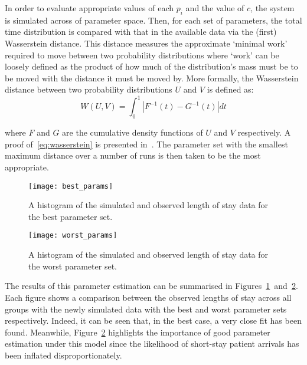 In order to evaluate appropriate values of each \(p_i\) and the value of \(c\),
the system is simulated across of parameter space. Then, for each set of
parameters, the total time distribution is compared with that in the available
data via the (first) Wasserstein distance. This distance measures the
approximate `minimal work' required to move between two probability
distributions where `work' can be loosely defined as the product of how much of
the distribution's mass must be to be moved with the distance it must be moved
by. More formally, the Wasserstein distance between two probability
distributions \(U\) and \(V\) is defined as:
\begin{equation}\label{eq:wasserstein}
    W(U, V) = \int_{0}^{1} \left\vert F^{-1}(t) - G^{-1}(t) \right\vert dt
\end{equation}

\noindent where \(F\) and \(G\) are the cumulative density functions of \(U\)
and \(V\) respectively. A proof of~\eqref{eq:wasserstein} is presented
in~\cite{Ramdas2017}. The parameter set with the smallest maximum distance over
a number of runs is then taken to be the most appropriate.

\begin{figure}
    \centering%
    \texttt{[image: best\_params]}
    \caption{A histogram of the simulated and observed length of stay data for
             the best parameter set.}\label{fig:best_params}
\end{figure}

\begin{figure}
    \centering%
    \texttt{[image: worst\_params]}
    \caption{A histogram of the simulated and observed length of stay data for
             the worst parameter set.}\label{fig:worst_params}
\end{figure}

The results of this parameter estimation can be summarised in
Figures~\ref{fig:best_params}~and~\ref{fig:worst_params}. Each figure shows a
comparison between the observed lengths of stay across all groups with the newly
simulated data with the best and worst parameter sets respectively. Indeed, it
can be seen that, in the best case, a very close fit has been found. Meanwhile,
Figure~\ref{fig:worst_params} highlights the importance of good parameter
estimation under this model since the likelihood of short-stay patient arrivals
has been inflated disproportionately.
